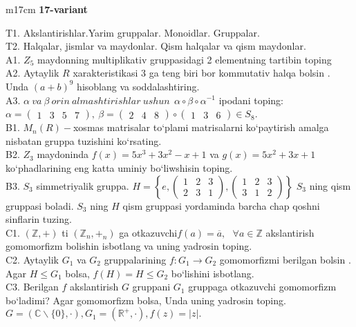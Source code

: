 \documentclass{article}
\begin{document}
\begin{tabular}{m{17cm}}
\textbf{17-variant}
\newline

T1. Akslantirishlar.Yarim gruppalar. Monoidlar. Gruppalar. \\
T2. Halqalar, jismlar va maydonlar. Qism halqalar va qism maydonlar. \\
A1. \(Z_{5}\) maydonning multiplikativ gruppasidagi 2 elementning tartibin toping \\
A2. Aytaylik \(R\) xarakteristikasi 3 ga teng biri bor kommutativ halqa bo\textquotesingle lsin . Unda \((a + b)^{9}\) hisoblang va soddalashtiring. \\
A3. \(\alpha\ va\ \beta\ orin\ almashtirishlar\ ushun\ \ \alpha \circ \beta \circ \alpha^{- 1}\) ipodani toping:\(\alpha = \begin{pmatrix}
1 & 3 & 5 & 7
\end{pmatrix},\ \beta = \begin{pmatrix}
2 & 4 & 8
\end{pmatrix} \circ \begin{pmatrix}
1 & 3 & 6
\end{pmatrix} \in S_{8}\). \\
B1. \(M_{n}(R) -\)xosmas matrisalar to`plami matrisalarni ko`paytirish amalga nisbatan gruppa tuzishini ko`rsating. \\
B2. \(Z_{3}\) maydoninda \(f(x) = 5x^{3} + 3x^{2} - x + 1\) va \(g(x) = 5x^{2} + 3x + 1\) ko`phadlarining eng katta uminiy bo`liwshisin toping. \\
B3. \(S_{3}\) simmetriyalik gruppa. \(H = \left\{ e,\begin{pmatrix}
1 & 2 & 3 \\
2 & 3 & 1
\end{pmatrix},\begin{pmatrix}
1 & 2 & 3 \\
3 & 1 & 2
\end{pmatrix} \right\}\) \(S_{3}\) ning qism gruppasi bola\textquotesingle di. \(S_{3}\) ning \(H\) qism gruppasi yordaminda barcha chap qo\textquotesingle shni sinflarin tuzing. \\
C1. \(\left( \mathbb{Z}, + \right)\) ti \(\left( \mathbb{Z}_{n}, +_{n} \right)\) ga o\textquotesingle tkazuvchi\(f(a) = \overline{a},\ \ \ \forall a\mathbb{\in Z}\) akslantirish gomomorfizm bolishin isbotlang va uning yadrosin toping. \\
C2. Aytaylik \(G_{1}\) va \(G_{2}\) gruppalarining \(f:G_{1} \rightarrow G_{2}\) gomomorfizmi berilgan bo\textquotesingle lsin . Agar \(H \leq G_{1}\) bolsa, \(f(H) = H \leq G_{2}\) bo`lishini isbotlang. \\
C3. Berilgan \(f\) akslantirish \(G\) gruppani \(G_{1}\) gruppaga o\textquotesingle tkazuvchi gomomorfizm bo`ladimi? Agar gomomorfizm bolsa, Unda uning yadrosin toping.\(G = (\mathbb{C}\backslash\{ 0\}, \cdot ),G_{1} = \left( \mathbb{R}^{+}, \cdot \right),f(z) = |z|.\) \\

\end{tabular}
\vspace{1cm}
\end{document}

